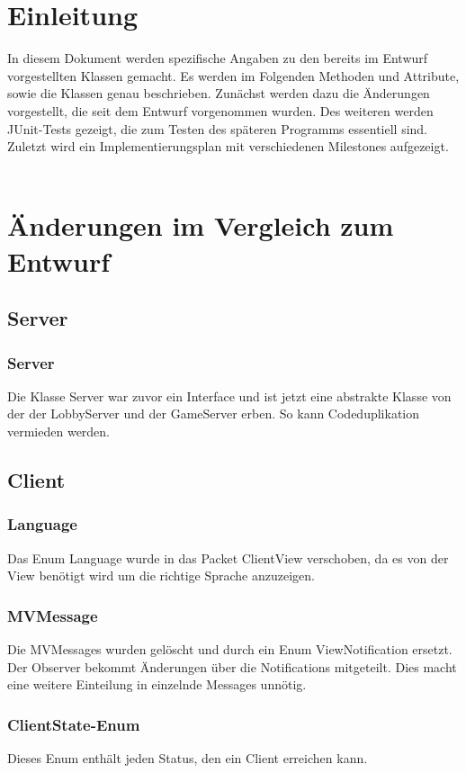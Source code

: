 \documentclass[twoside]{article}
\begin{document}
\section{Einleitung}
In diesem Dokument werden spezifische Angaben zu den bereits im Entwurf vorgestellten Klassen gemacht. Es werden im Folgenden Methoden und Attribute, sowie die Klassen genau beschrieben. Zunächst werden dazu die Änderungen vorgestellt, die seit dem Entwurf vorgenommen wurden. Des weiteren werden JUnit-Tests gezeigt, die zum Testen des späteren Programms essentiell sind. Zuletzt wird ein Implementierungsplan mit verschiedenen Milestones aufgezeigt. \\ \\

\section{Änderungen im Vergleich zum Entwurf}
\subsection{Server}
\subsubsection{Server}
Die Klasse Server war zuvor ein Interface und ist jetzt eine abstrakte Klasse von der der LobbyServer und der GameServer erben. So kann Codeduplikation vermieden werden.
\subsection{Client}
\subsubsection{Language}
Das Enum Language wurde in das Packet ClientView verschoben, da es von der View benötigt wird um die richtige Sprache anzuzeigen.
\subsubsection{MVMessage}
Die MVMessages wurden gelöscht und durch ein Enum ViewNotification ersetzt. Der Observer bekommt Änderungen über die Notifications mitgeteilt. Dies macht eine weitere Einteilung in einzelnde Messages unnötig.
\subsubsection{ClientState-Enum}
Dieses Enum enthält jeden Status, den ein Client erreichen kann.
\end{document}
